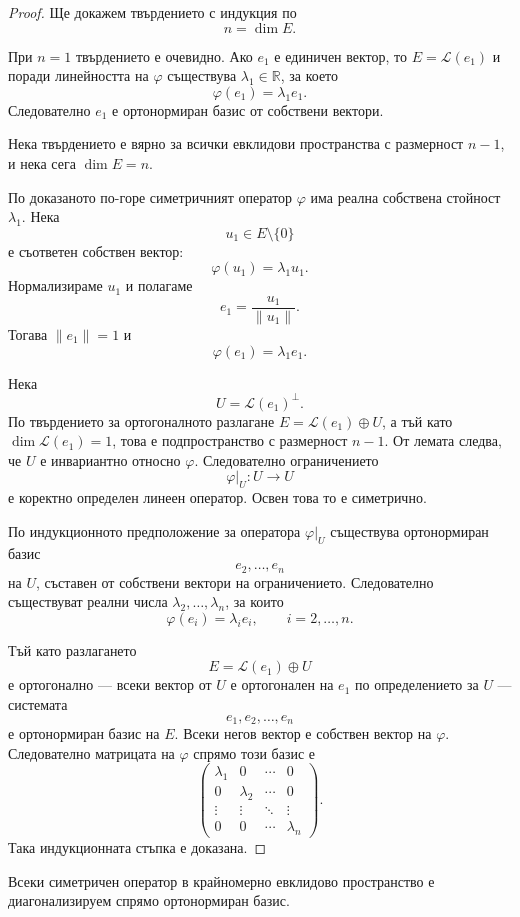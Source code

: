 \begin{proof}
Ще докажем твърдението с индукция по
\[
n=\dim E.
\]

При $n=1$ твърдението е очевидно. Ако $e_1$ е единичен вектор, то $E=\mathcal{L}(e_1)$ и поради линейността на $\varphi$ съществува $\lambda_1\in\mathbb{R}$, за което
\[
\varphi(e_1)=\lambda_1e_1.
\]
Следователно $e_1$ е ортонормиран базис от собствени вектори.

Нека твърдението е вярно за всички евклидови пространства с размерност $n-1$, и нека сега $\dim E=n$.

По доказаното по-горе симетричният оператор $\varphi$ има реална собствена стойност $\lambda_1$. Нека
\[
u_1\in E\setminus\{0\}
\]
е съответен собствен вектор:
\[
\varphi(u_1)=\lambda_1u_1.
\]
Нормализираме $u_1$ и полагаме
\[
e_1=\frac{u_1}{\|u_1\|}.
\]
Тогава $\|e_1\|=1$ и
\[
\varphi(e_1)=\lambda_1e_1.
\]

Нека
\[
U=\mathcal{L}(e_1)^\perp.
\]
По твърдението за ортогоналното разлагане $E=\mathcal{L}(e_1)\oplus U$, а тъй като $\dim\mathcal{L}(e_1)=1$, това е подпространство с размерност $n-1$. От лемата следва, че $U$ е инвариантно относно $\varphi$. Следователно ограничението
\[
\varphi|_U:U\to U
\]
е коректно определен линеен оператор. Освен това то е симетрично.

По индукционното предположение за оператора $\varphi|_U$ съществува ортонормиран базис
\[
e_2,\ldots,e_n
\]
на $U$, съставен от собствени вектори на ограничението. Следователно съществуват реални числа $\lambda_2,\ldots,\lambda_n$, за които
\[
\varphi(e_i)=\lambda_i e_i,
\qquad i=2,\ldots,n.
\]

Тъй като разлагането
\[
E=\mathcal{L}(e_1)\oplus U
\]
е ортогонално --- всеки вектор от $U$ е ортогонален на $e_1$ по определението за $U$ --- системата
\[
e_1,e_2,\ldots,e_n
\]
е ортонормиран базис на $E$. Всеки негов вектор е собствен вектор на $\varphi$. Следователно матрицата на $\varphi$ спрямо този базис е
\[
\begin{pmatrix}
\lambda_1 & 0 & \cdots & 0\\
0 & \lambda_2 & \cdots & 0\\
\vdots & \vdots & \ddots & \vdots\\
0 & 0 & \cdots & \lambda_n
\end{pmatrix}.
\]
Така индукционната стъпка е доказана.
\end{proof}

\begin{cor}
Всеки симетричен оператор в крайномерно евклидово пространство е диагонализируем спрямо ортонормиран базис.
\end{cor}

